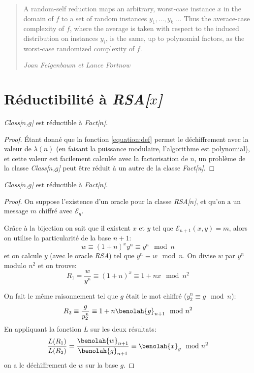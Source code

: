 	\begin{quotation}
		A random-self reduction maps an arbitrary, worst-case instance $x$ in the domain of $f$ to a set
		of random instances $y_1, \dots, y_k$ ... Thus the averace-case complexity of $f$, where the 
		average is taken with respect to the induced
		distribution on instances $y_i$, is the same, up to polynomial factors, as the worst-case 
		randomized complexity of $f$.

		\hfill \em Joan Feigenbaum et Lance Fortnow\cite{Feigenbaum91onthe}
	\end{quotation}


\section{Réductibilité à \emph{RSA[$x$]}}
	\begin{theorem} \emph{Class[$n$,$g$]} est réductible à \emph{Fact[$n$]}.
		\label{theorem:rsa}
		\begin{proof}
			Étant donné que la fonction \ref{equation:def} permet
			le déchiffrement avec la valeur de $\lambda(n)$
			(en faisant la puissance modulaire, l'algorithme est polynomial), et cette
			valeur est facilement calculée avec la factorisation de $n$,
			un problème de la classe \emph{Class[$n$,$g$]} peut être 
			réduit à un autre de la classe \emph{Fact[n]}.
		\end{proof}
	\end{theorem} 
	\begin{theorem} \emph{Class[$n$,$g$]} est réductible à \emph{Fact[$n$]}.
		\label{theorem:fact}
		\begin{proof}
			On suppose l'existence d'un oracle pour la classe \emph{RSA[$n$]}, et qu'on 
			a un message $m$ chiffré avec $\mathcal{E}_g$. 

			Grâce à la bijection on sait que il existent $x$ et $y$ tel que
			$\mathcal{E}_{n+1}(x,y) = m$, alors on utilise la particularité de 
			la base $n+1$:
			$$w \equiv (1+n)^xy^n \equiv y^n\mod n$$
			et on calcule $y$ (avec le oracle \emph{RSA}) tel que $y^n \equiv w \mod{n}$. On divise $w$ par
			$y^n$ modulo $n^2$ et on trouve: $$R_1=\frac{w}{y^n} \equiv (1+n)^x \equiv 1+nx\mod{n^2}$$

			On fait le même raisonnement tel que $g$ était le mot chiffré ($y_2^n \equiv g\mod{n}$):
			$$R_2 \equiv \frac{g}{y_2^n} \equiv 1+n\benolah{g}_{n+1}\mod{n^2}$$
			En appliquant la fonction $L$ sur les deux résultats:
				$$\frac{L(R_1)}{L(R_2)} = \frac{\benolah{w}_{n+1}}{\benolah{g}_{n+1}} \equiv \benolah{x}_{g} \mod{n^2} $$ 
			on a le déchiffrement de $w$ sur la base $g$.	
		\end{proof}
	\end{theorem}

